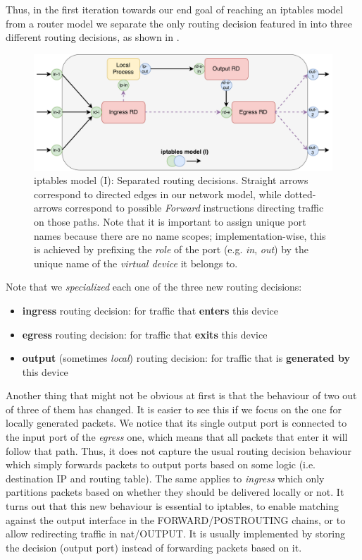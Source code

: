 Thus, in the first iteration towards our end goal of reaching an iptables model
from a router model we separate the only routing decision featured in
 into three different routing
decisions, as shown in .

\begin{figure}[h]
  \centering
  \captionsetup{justification=centering}
  \includegraphics[scale=0.5]{src/img/iptables-1}
  \caption[iptables model (I): Separated routing decisions.]{iptables model
  (I): Separated routing decisions.  Straight arrows correspond to directed
  edges in our network model, while dotted-arrows correspond to possible
  \emph{Forward} instructions directing traffic on those paths. Note that it is
  important to assign unique port names because there are no name scopes;
  implementation-wise, this is achieved by prefixing the \emph{role} of the
  port (e.g.  \emph{in}, \emph{out}) by the unique name of the \emph{virtual
  device} it belongs to.}
  \label{fig:iptables-1}
\end{figure}

Note that we \emph{specialized} each one of the three new routing decisions:
\begin{itemize}
  \item \textbf{ingress} routing decision: for traffic that \textbf{enters}
    this device
  \item \textbf{egress} routing decision: for traffic that \textbf{exits} this
    device
  \item \textbf{output} (sometimes \emph{local}) routing decision: for traffic
    that is \textbf{generated by} this device
\end{itemize}

Another thing that might not be obvious at first is that the behaviour of two
out of three of them has changed.  It is easier to see this if we focus on the
one for locally generated packets.  We notice that its single output port is
connected to the input port of the \emph{egress} one, which means that all
packets that enter it will follow that path.  Thus, it does not capture the
usual routing decision behaviour which simply forwards packets to output ports
based on some logic (i.e. destination IP and routing table).  The same applies
to \emph{ingress} which only partitions packets based on whether they should be
delivered locally or not.  It turns out that this new behaviour is essential to
iptables, to enable matching against the output interface in the
FORWARD/POSTROUTING chains, or to allow redirecting traffic in nat/OUTPUT. It
is usually implemented by storing the decision (output port) instead of
forwarding packets based on it.

